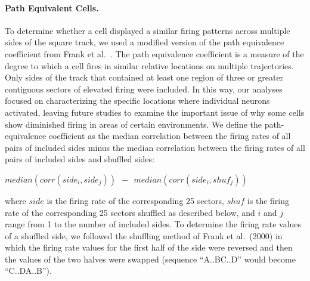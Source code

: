 %
%
%

\paragraph{Path Equivalent Cells.} To determine whether a cell displayed a similar firing patterns across multiple sides of the square track, we used a modified version of the path equivalence coefficient from Frank et al.\ \citep{FranEtal00}. The path equivalence coefficient is a measure of the degree to which a cell fires in similar relative locations on multiple trajectories. Only sides of the track that contained at least one region of three or greater contiguous sectors of elevated firing were included. In this way, our analyses focused on characterizing the specific locations where individual neurons activated, leaving future studies to examine the  important issue of why some cells show diminished firing in areas of certain environments. We define the path-equivalence coefficient as the median correlation between the firing rates of all pairs of included sides minus the median correlation between the firing rates of all pairs of included sides and shuffled sides:

\(median(corr(side_{i},side_{j})) ~~ - ~~ median(corr(side_{i},shuf_{j}))\)

where $side$ is the firing rate of the corresponding 25 sectors, $shuf$ is the firing rate of the corresponding 25 sectors shuffled as described below, and $i$ and $j$ range from 1 to the number of included sides. To determine the firing rate values of a  shuffled side, we followed the shuffling method of Frank et al.\ (2000) in which the firing rate values for the first half of the side were reversed and then the values of the two halves were swapped  (sequence ``A..BC..D''  would become ``C..DA..B'').

